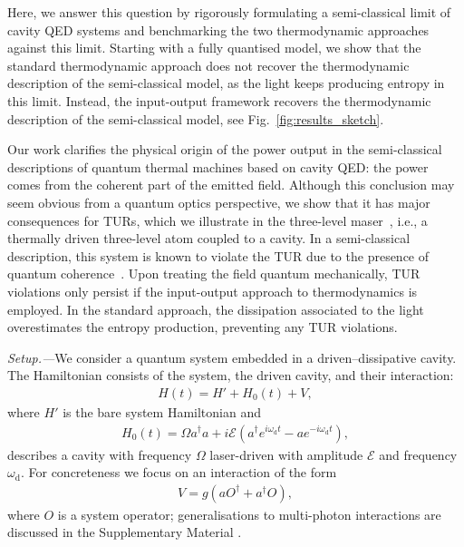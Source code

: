 \documentclass[aps,twocolumn,10pt,prl,floatfix,nofootinbib, superscriptaddress]{revtex4-2}
\begin{document}
Here, we answer this question by rigorously formulating a semi-classical limit of cavity QED systems and benchmarking the two thermodynamic approaches against this limit.
Starting with a fully quantised model, we show that the standard thermodynamic approach does not recover the thermodynamic description of the semi-classical model, as the light keeps producing entropy in this limit. Instead, the input-output framework recovers the thermodynamic description of the semi-classical model, see Fig.~\ref{fig:results_sketch}.


Our work clarifies the physical origin of the power output in the semi-classical descriptions of quantum thermal machines based on cavity QED: the power comes from the coherent part of the emitted field.
Although this conclusion may seem  obvious from a quantum optics perspective, we show that it has major consequences for TURs, which we illustrate in the three-level maser~\cite{Geusic1967, kosloff_1984, Mitchison2019}, i.e., a thermally driven three-level atom coupled to a cavity.
In a semi-classical description, this system is known to violate the TUR due to the presence of quantum coherence~\cite{Kalaee_2021}. Upon treating the field quantum mechanically,  TUR violations only persist if the input-output approach to thermodynamics is employed. In the standard approach, the dissipation associated to the light overestimates the entropy production, preventing any TUR violations.





\textit{Setup.—}We consider a quantum system embedded in a driven–dissipative cavity.
The Hamiltonian consists of the system, the driven cavity, and their interaction:
\begin{align}
H(t) = H' + H_0(t) + V,
\end{align}
where $H'$ is the bare system Hamiltonian and
\begin{align}
H_0(t) = \Omega a^\dagger a
+ i\mathcal{E}\!\left(a^\dagger e^{i\omega_\text{d} t} - a e^{-i\omega_\text{d} t}\right),
\end{align}
describes a cavity with frequency $\Omega$ laser-driven with amplitude $\mathcal{E}$ and frequency $\omega_\text{d}$.
For concreteness we focus on an interaction of the form
\begin{align}
V = g(aO^\dagger + a^\dagger O),
\label{eq:flipflop-interaction}
\end{align}
where $O$ is a system operator; generalisations to multi-photon interactions are discussed in the Supplementary Material \cite{supmat}.
\end{document}
